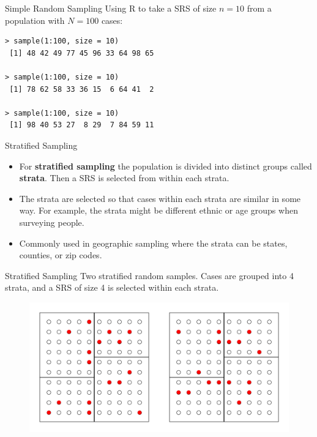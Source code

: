 \documentclass{beamer}
\begin{document}
\begin{frame}[fragile]{Simple Random Sampling}
Using R to take a SRS of size $n=10$ from a population with $N=100$ cases:
\begin{verbatim}
> sample(1:100, size = 10)
 [1] 48 42 49 77 45 96 33 64 98 65
 
> sample(1:100, size = 10)
 [1] 78 62 58 33 36 15  6 64 41  2
 
> sample(1:100, size = 10)
 [1] 98 40 53 27  8 29  7 84 59 11
\end{verbatim}
\end{frame}

\begin{frame}{Stratified Sampling}
\begin{itemize}
\item For \textbf{stratified sampling} the population is divided into distinct groups called \textbf{strata}.  Then a SRS is selected from within each strata.
\vspace{5pt}
\item The strata are selected so that cases within each strata are similar in some way.  For example, the strata might be different ethnic or age groups when surveying people.
\vspace{5pt}
\item Commonly used in geographic sampling where the strata can be states, counties, or zip codes.   
\end{itemize}
\end{frame}

\begin{frame}{Stratified Sampling}
Two stratified random samples.  Cases are grouped into 4 strata, and a SRS of size 4 is selected within each strata.  

\begin{figure}
\includegraphics[scale=0.4]{figure/strat.pdf}
\end{figure}
\end{frame}
\end{document}
